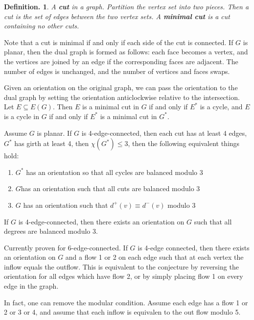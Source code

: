 \documentclass[11pt, a4paper]{memoir}
\theoremstyle{change}
\theoremstyle{plain}
\theoremstyle{nonumberplain}
\newtheorem{definition}{Definition.}
\numberwithin{equation}{section}
\begin{document}
\begin{definition}
    A \textbf{cut} in a graph.
    Partition the vertex set into two pieces.
    Then a cut is the set of edges between the two vertex sets.
    A \textbf{minimal cut} is a cut containing no other cuts.
\end{definition}
Note that a cut is minimal if and only if each side of the cut is connected.
If $G$ is planar, then the dual graph is formed as follows: each face becomes a vertex, and the vertices are joined by an edge if the corresponding faces are adjacent.
The number of edges is unchanged, and the number of vertices and faces swaps.

Given an orientation on the original graph, we can pass the orientation to the dual graph by setting the orientation anticlockwise relative to the intersection.
Let $E\subseteq E(G)$.
Then $E$ is a minimal cut in $G$ if and only if $E^*$ is a cycle, and $E$ is a cycle in $G$ if and only if $E^*$ is a minimal cut in $G^*$.

Assume $G$ is planar.
If $G$ is 4-edge-connected, then each cut has at least 4 edges, $G^*$ has girth at least 4, then $\chi(G^*)\leq 3$, then the following equivalent things hold:
\begin{enumerate}[nl,r]
    \item $G^*$ has an orientation so that all cycles are balanced modulo 3
    \item $G$has an orientation such that all cuts are balanced modulo 3
    \item $G$ has an orientation such that $d^+(v)\equiv d^-(v)$ modulo 3
\end{enumerate}
\begin{conjecture}[Tutte]
    If $G$ is 4-edge-connected, then there exists an orientation on $G$ such that all degrees are balanced modulo 3.
\end{conjecture}
Currently proven for 6-edge-connected.
If $G$ is 4-edge connected, then there exists an orientation on $G$ and a flow 1 or 2 on each edge such that at each vertex the inflow equals the outflow.
This is equivalent to the conjecture by reversing the orientation for all edges which have flow 2, or by simply placing flow 1 on every edge in the graph.

In fact, one can remove the modular condition.
Assume each edge has a flow 1 or 2 or 3 or 4, and assume that each inflow is equivalen to the out flow modulo 5.
\end{document}

